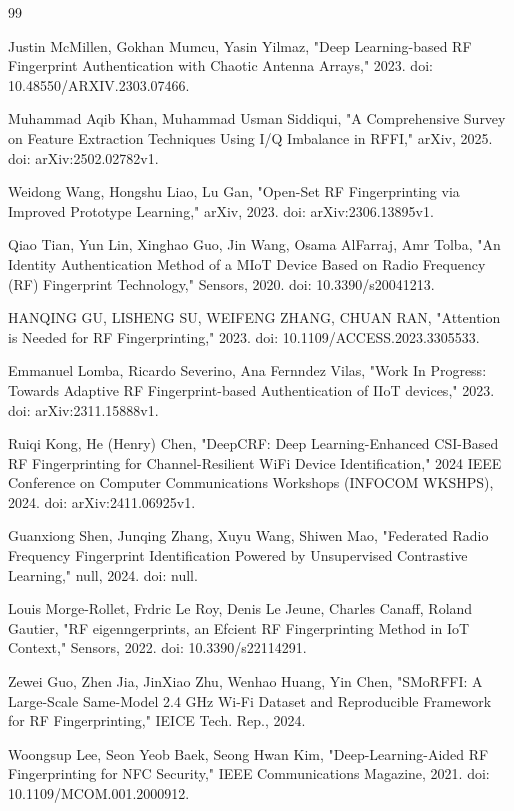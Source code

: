 \documentclass[conference]{IEEEtran}
\begin{document}
\begin{thebibliography}{99}

Justin McMillen, Gokhan Mumcu, Yasin Yilmaz, "Deep Learning-based RF Fingerprint Authentication with Chaotic Antenna Arrays," 2023. doi: 10.48550/ARXIV.2303.07466.

Muhammad Aqib Khan, Muhammad Usman Siddiqui, "A Comprehensive Survey on Feature Extraction Techniques Using I/Q Imbalance in RFFI," arXiv, 2025. doi: arXiv:2502.02782v1.

Weidong Wang, Hongshu Liao, Lu Gan, "Open-Set RF Fingerprinting via Improved Prototype Learning," arXiv, 2023. doi: arXiv:2306.13895v1.

Qiao Tian, Yun Lin, Xinghao Guo, Jin Wang, Osama AlFarraj, Amr Tolba, "An Identity Authentication Method of a MIoT Device Based on Radio Frequency (RF) Fingerprint Technology," Sensors, 2020. doi: 10.3390/s20041213.

HANQING GU, LISHENG SU, WEIFENG ZHANG, CHUAN RAN, "Attention is Needed for RF Fingerprinting," 2023. doi: 10.1109/ACCESS.2023.3305533.

Emmanuel Lomba, Ricardo Severino, Ana Fernndez Vilas, "Work In Progress: Towards Adaptive RF Fingerprint-based Authentication of IIoT devices," 2023. doi: arXiv:2311.15888v1.

Ruiqi Kong, He (Henry) Chen, "DeepCRF: Deep Learning-Enhanced CSI-Based RF Fingerprinting for Channel-Resilient WiFi Device Identification," 2024 IEEE Conference on Computer Communications Workshops (INFOCOM WKSHPS), 2024. doi: arXiv:2411.06925v1.

Guanxiong Shen, Junqing Zhang, Xuyu Wang, Shiwen Mao, "Federated Radio Frequency Fingerprint Identification Powered by Unsupervised Contrastive Learning," null, 2024. doi: null.

Louis Morge-Rollet, Frdric Le Roy, Denis Le Jeune, Charles Canaff, Roland Gautier, "RF eigenngerprints, an Efcient RF Fingerprinting Method in IoT Context," Sensors, 2022. doi: 10.3390/s22114291.

Zewei Guo, Zhen Jia, JinXiao Zhu, Wenhao Huang, Yin Chen, "SMoRFFI: A Large-Scale Same-Model 2.4 GHz Wi-Fi Dataset and Reproducible Framework for RF Fingerprinting," IEICE Tech. Rep., 2024.

Woongsup Lee, Seon Yeob Baek, Seong Hwan Kim, "Deep-Learning-Aided RF Fingerprinting for NFC Security," IEEE Communications Magazine, 2021. doi: 10.1109/MCOM.001.2000912.


\end{thebibliography}
\end{document}
